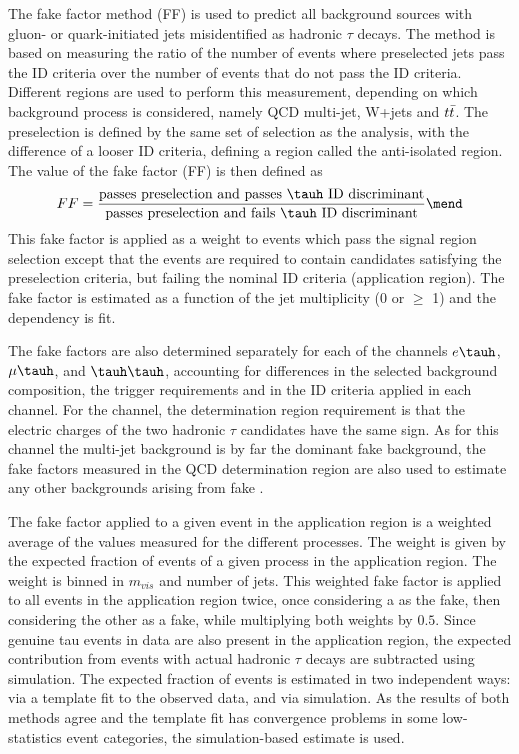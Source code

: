 The fake factor method (FF) is used to predict all background sources with gluon- or quark-initiated jets misidentified as hadronic $\tau$ decays. The method is based on measuring the ratio of the number of events where preselected jets pass the \tauh ID criteria over the number of events that do not pass the ID criteria. Different regions are used to perform this measurement, depending on which background process is considered, namely QCD multi-jet, W+jets and $t\Bar{t}$. The preselection is defined by the same set of selection as the analysis, with the difference of a looser \tauh ID criteria, defining a region called the anti-isolated region. The value of the fake factor (FF) is then defined as
\begin{equation}
    FF = \frac{\text{passes preselection and passes \tauh ID discriminant}}{\text{passes preselection and fails \tauh ID discriminant}} \mend
\end{equation}
This fake factor is applied as a weight to events which pass the signal region selection except that the events are required to contain \tauh candidates satisfying the preselection criteria, but failing the nominal \tauh ID criteria (application region). The fake factor is estimated as a function of the jet multiplicity (0 or $\geq$ 1) and the \pt dependency is fit.

The fake factors are also determined separately for each of the channels $e\tauh$, $\mu\tauh$, and $\tauh\tauh$, accounting for differences in the selected background composition, the trigger requirements and in the \tauh ID criteria applied in each channel. For the \tauh\tauh channel, the determination region requirement is that the electric charges of the two hadronic $\tau$ candidates have the same sign. As for this channel the multi-jet background is by far the dominant fake \tauh background, the fake factors measured in the QCD determination region are also used to estimate any other backgrounds arising from fake \tauh.

The fake factor applied to a given event in the application region is a weighted average of the values measured for the different processes. The weight is given by the expected fraction of events of a given process in the application region. The weight is binned in $m_{vis}$ and number of jets. This weighted fake factor is applied to all events in the application region twice, once considering a \tauh as the fake, then considering the other as a fake, while multiplying both weights by $0.5$. Since genuine tau events in data are also present in the application region, the expected contribution from events with actual hadronic $\tau$ decays are subtracted using simulation. The expected fraction of events is estimated in two independent ways: via a template fit to the observed data, and via simulation. As the results of both methods agree and the template fit has convergence problems in some low-statistics event categories, the simulation-based estimate is used.


